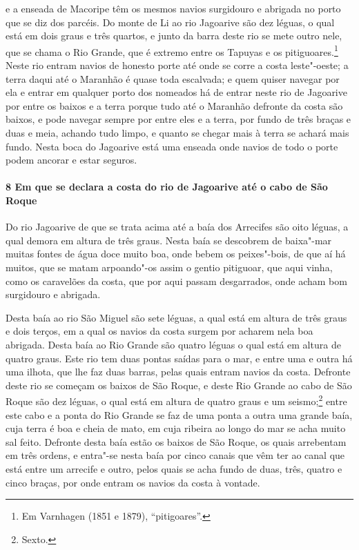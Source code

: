 \begin{linenumbers}
e a enseada de Macoripe têm os mesmos navios surgidouro e abrigada no porto que se diz dos
parcéis. Do monte de Li ao rio Jagoarive são dez léguas, o qual está em dois graus e três
quartos, e junto da barra deste rio se mete outro nele, que se chama o Rio Grande, que é
extremo entre os Tapuyas e os pitiguoares.\footnote{ Em Varnhagen (1851 e 1879),
``pitigoares''.} Neste rio entram navios de honesto porte até onde se corre a costa
leste"-oeste; a terra daqui até o Maranhão é quase toda escalvada; e quem quiser navegar
por ela e entrar em qualquer porto dos nomeados há de entrar neste rio de Jagoarive por
entre os baixos e a terra porque tudo até o Maranhão defronte da costa são baixos, e pode
navegar sempre por entre eles e a terra, por fundo de três braças e duas e meia, achando
tudo limpo, e quanto se chegar mais à terra se achará mais fundo. Nesta boca do Jagoarive
está uma enseada onde navios de todo o porte podem ancorar e estar seguros.

\paragraph{8 Em que se declara a costa do rio de Jagoarive até o cabo de São Roque} \quad
Do rio Jagoarive de que se trata acima até a baía dos Arrecifes são oito léguas, a qual
demora em altura de três graus. Nesta baía se descobrem de baixa"-mar muitas fontes de água
doce muito boa, onde bebem os peixes"-bois, de que aí há muitos, que se matam arpoando"-os
assim o gentio pitiguoar, que aqui vinha, como os caravelões da costa, que por aqui passam
desgarrados, onde acham bom surgidouro e abrigada.

Desta baía ao rio São Miguel são sete léguas, a qual está em altura de três graus e dois
terços, em a qual os navios da costa surgem por acharem nela boa abrigada. Desta baía ao
Rio Grande são quatro léguas o qual está em altura de quatro graus. Este rio tem duas
pontas saídas para o mar, e entre uma e outra há uma ilhota, que lhe faz duas barras,
pelas quais entram navios da costa. Defronte deste rio se começam os baixos de São Roque,
e deste Rio Grande ao cabo de São Roque são dez léguas, o qual está em altura de quatro
graus e um seismo;\footnote{ Sexto.} entre este cabo e a ponta do Rio Grande se faz de uma
ponta a outra uma grande baía, cuja terra é boa e cheia de mato, em cuja ribeira ao longo
do mar se acha muito sal feito. Defronte desta baía estão os baixos de São Roque, os quais
arrebentam em três ordens, e entra"-se nesta baía por cinco canais que vêm ter ao canal que
está entre um arrecife e outro, pelos quais se acha fundo de duas, três, quatro e cinco
braças, por onde entram os navios da costa à vontade.


\end{linenumbers}
